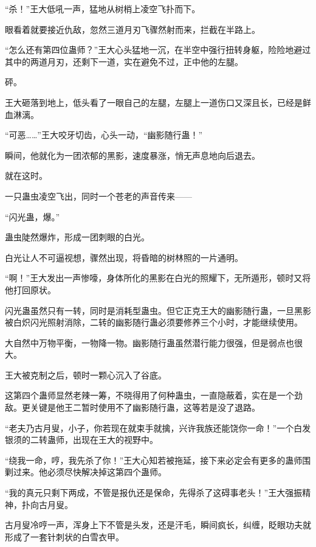 
\begin{this_body}



“杀！”王大低吼一声，猛地从树梢上凌空飞扑而下。

眼看着就要接近仇敌，忽然三道月刃飞骤然射而来，拦截在半路上。

“怎么还有第四位蛊师？”王大心头猛地一沉，在半空中强行扭转身躯，险险地避过其中的两道月刃，还剩下一道，实在避免不过，正中他的左腿。

砰。

王大砸落到地上，低头看了一眼自己的左腿，左腿上一道伤口又深且长，已经是鲜血淋漓。

“可恶……”王大咬牙切齿，心头一动，“幽影随行蛊！”

瞬间，他就化为一团浓郁的黑影，速度暴涨，悄无声息地向后退去。

就在这时。

一只蛊虫凌空飞出，同时一个苍老的声音传来——

“闪光蛊，爆。”

蛊虫陡然爆炸，形成一团刺眼的白光。

白光让人不可逼视想，骤然出现，将昏暗的树林照的一片通明。

“啊！”王大发出一声惨嚎，身体所化的黑影在白光的照耀下，无所遁形，顿时又将他打回原状。

闪光蛊虽然只有一转，同时是消耗型蛊虫。但它正克王大的幽影随行蛊，一旦黑影被白炽闪光照射消除，二转的幽影随行蛊必须要修养三个小时，才能继续使用。

大自然中万物平衡，一物降一物。幽影随行蛊虽然潜行能力很强，但是弱点也很大。

王大被克制之后，顿时一颗心沉入了谷底。

这第四个蛊师显然老辣一筹，不晓得用了何种蛊虫，一直隐蔽着，实在是一个劲敌。更关键是他王二暂时使用不了幽影随行蛊，这等若是没了退路。

“老夫乃古月叟，小子，你若现在就束手就擒，兴许我族还能饶你一命！”一个白发银须的二转蛊师，出现在王大的视野中。

“绕我一命，哼，我先杀了你！”王大心知若被拖延，接下来必定会有更多的蛊师围剿过来。他必须尽快解决掉这第四个蛊师。

“我的真元只剩下两成，不管是报仇还是保命，先得杀了这碍事老头！”王大强振精神，扑向古月叟。

古月叟冷哼一声，浑身上下不管是头发，还是汗毛，瞬间疯长，纠缠，眨眼功夫就形成了一套针刺状的白雪衣甲。


\end{this_body}
